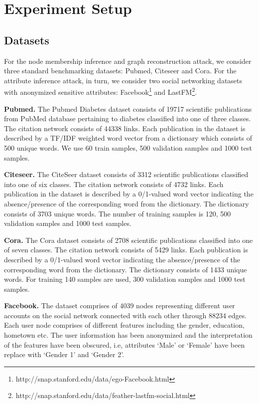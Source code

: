 \section{Experiment Setup}\label{setup}


\subsection{Datasets}

For the node membership inference and graph reconstruction attack, we consider three standard benchmarking datasets: Pubmed, Citeseer and Cora.
For the attribute inference attack, in turn, we consider two social networking datasets with anonymized sensitive attributes: Facebook\footnote{http://snap.stanford.edu/data/ego-Facebook.html} and LastFM\footnote{http://snap.stanford.edu/data/feather-lastfm-social.html}.

\noindent\textbf{Pubmed.} The Pubmed Diabetes dataset consists of 19717 scientific publications from PubMed database pertaining to diabetes classified into one of three classes. The citation network consists of 44338 links. Each publication in the dataset is described by a TF/IDF weighted word vector from a dictionary which consists of 500 unique words.
We use 60 train samples, 500 validation samples and 1000 test samples.

\noindent\textbf{Citeseer.} The CiteSeer dataset consists of 3312 scientific publications classified into one of six classes.
The citation network consists of 4732 links. Each publication in the dataset is described by a 0/1-valued word vector indicating the absence/presence of the corresponding word from the dictionary.
The dictionary consists of 3703 unique words.
The number of training samples is 120, 500 validation samples and 1000 test samples.

\noindent\textbf{Cora.} The Cora dataset consists of 2708 scientific publications classified into one of seven classes.
The citation network consists of 5429 links. Each publication is described by a 0/1-valued word vector indicating the absence/presence of the corresponding word from the dictionary.
The dictionary consists of 1433 unique words.
For training 140 samples are used, 300 validation samples and 1000 test samples.

\noindent\textbf{Facebook.} The dataset comprises of 4039 nodes representing different user accounts on the social network connected with each other through 88234 edges.
Each user node comprises of different features including the gender, education, hometown etc.
The user information has been anonymized and the interpretation of the features have been obscured, i.e, attributes `Male' or `Female' have been replace with `Gender 1' and `Gender 2'.

